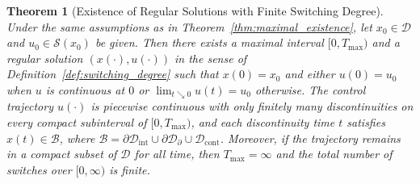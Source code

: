 \documentclass[sn-basic,Numbered]{sn-jnl}
\theoremstyle{thmstyleone}%
\newtheorem{theorem}{Theorem}%
\begin{document}
\begin{theorem}[Existence of Regular Solutions with Finite Switching Degree]\label{thm:regular_solution_existence}
Under the same assumptions as in Theorem~\ref{thm:maximal_existence}, let $x_0 \in \mathcal{D}$ and $u_0 \in \mathcal{S}(x_0)$ be given. Then there exists a maximal interval $[0, T_{\max})$ and a regular solution $(x(\cdot), u(\cdot))$ in the sense of Definition~\ref{def:switching_degree} such that $x(0) = x_0$ and either $u(0) = u_0$ when $u$ is continuous at $0$ or $\lim_{t \searrow 0} u(t) = u_0$ otherwise. The control trajectory $u(\cdot)$ is piecewise continuous with only finitely many discontinuities on every compact subinterval of $[0, T_{\max})$, and each discontinuity time $t$ satisfies $x(t) \in \mathcal{B}$, where $\mathcal{B} = \partial \mathcal{D}_{\mathrm{int}} \cup \partial \mathcal{D}_{\partial} \cup \mathcal{D}_{\mathrm{cont}}$. Moreover, if the trajectory remains in a compact subset of $\mathcal{D}$ for all time, then $T_{\max} = \infty$ and the total number of switches over $[0, \infty)$ is finite.
\end{theorem}
\end{document}
